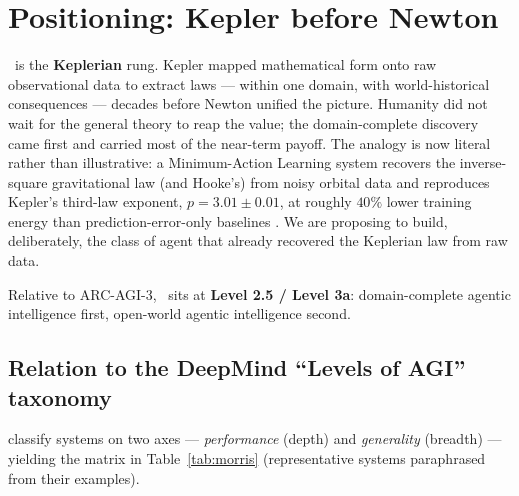 \section{Positioning: Kepler before Newton}
\label{sec:positioning}

\DCI\ is the \textbf{Keplerian} rung. Kepler mapped mathematical form onto raw observational data to extract laws --- within one domain, with world-historical consequences --- decades before Newton unified the picture. Humanity did not wait for the general theory to reap the value; the domain-complete discovery came first and carried most of the near-term payoff. The analogy is now literal rather than illustrative: a Minimum-Action Learning system recovers the inverse-square gravitational law (and Hooke's) from noisy orbital data and reproduces Kepler's third-law exponent, $p = 3.01 \pm 0.01$, at roughly $40\%$ lower training energy than prediction-error-only baselines \citep{frasch2026b}. We are proposing to build, deliberately, the class of agent that already recovered the Keplerian law from raw data.

Relative to ARC-AGI-3, \DCI\ sits at \textbf{Level 2.5 / Level 3a}: domain-complete agentic intelligence first, open-world agentic intelligence second.

\subsection{Relation to the DeepMind ``Levels of AGI'' taxonomy}
\label{sec:morris}

\citet{morris2024} classify systems on two axes --- \emph{performance} (depth) and \emph{generality} (breadth) --- yielding the matrix in Table~\ref{tab:morris} (representative systems paraphrased from their examples).

